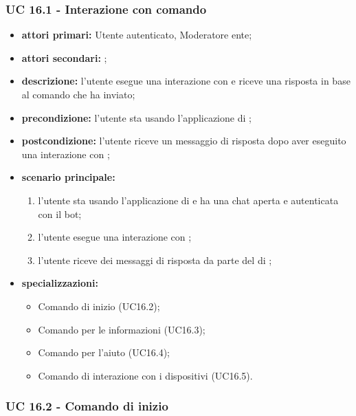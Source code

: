 	\subsubsection{UC 16.1 - Interazione con comando}

	\begin{itemize}
		\item \textbf{attori primari:} Utente autenticato, Moderatore ente;
		\item \textbf{attori secondari:} ;
		\item \textbf{descrizione:} l'utente esegue una interazione con  e riceve una risposta in base al comando che ha inviato;
		\item \textbf{precondizione:} l'utente sta usando l'applicazione di ;
		\item \textbf{postcondizione:} l'utente riceve un messaggio di risposta dopo aver eseguito una interazione con ;
		\item \textbf{scenario principale:}
		\begin{enumerate}
			\item l'utente sta usando l'applicazione di  e ha una chat aperta e autenticata con il bot; 
			\item l'utente esegue una interazione con ;
			\item l'utente riceve dei messaggi di risposta da parte del  di ;
		\end{enumerate}
		\item \textbf{specializzazioni:}
		\begin{itemize}
			\item Comando di inizio (UC16.2);
			\item Comando per le informazioni (UC16.3);
			\item Comando per l'aiuto (UC16.4);
			\item Comando di interazione con i dispositivi (UC16.5).
		\end{itemize}
	\end{itemize}

	\subsubsection{UC 16.2 - Comando di inizio}

